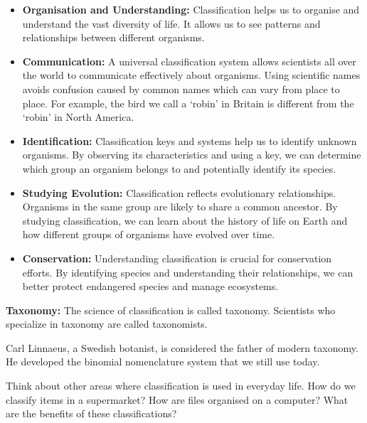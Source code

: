 \begin{itemize}
    \item \textbf{Organisation and Understanding:} Classification helps us to organise and understand the vast diversity of life. It allows us to see patterns and relationships between different organisms.
    \item \textbf{Communication:}  A universal classification system allows scientists all over the world to communicate effectively about organisms.  Using scientific names avoids confusion caused by common names which can vary from place to place. For example, the bird we call a ‘robin’ in Britain is different from the ‘robin’ in North America.
    \item \textbf{Identification:} Classification keys and systems help us to identify unknown organisms. By observing its characteristics and using a key, we can determine which group an organism belongs to and potentially identify its species.
    \item \textbf{Studying Evolution:} Classification reflects evolutionary relationships. Organisms in the same group are likely to share a common ancestor. By studying classification, we can learn about the history of life on Earth and how different groups of organisms have evolved over time.
    \item \textbf{Conservation:} Understanding classification is crucial for conservation efforts. By identifying species and understanding their relationships, we can better protect endangered species and manage ecosystems.
\end{itemize}

\begin{marginnote}
\textbf{Taxonomy:} The science of classification is called taxonomy. Scientists who specialize in taxonomy are called taxonomists.
\end{marginnote}

\begin{marginnote}
  Carl Linnaeus, a Swedish botanist, is considered the father of modern taxonomy. He developed the binomial nomenclature system that we still use today.
\end{marginnote}

\begin{stopandthink}
Think about other areas where classification is used in everyday life.  How do we classify items in a supermarket? How are files organised on a computer? What are the benefits of these classifications?
\end{stopandthink}

